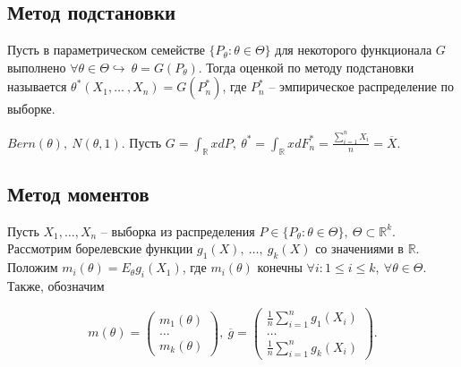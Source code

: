 \subsection*{Метод подстановки}

\begin{definition}
Пусть в параметрическом семействе $\displaystyle \{P_{\theta } :\theta \in \Theta \}$ для некоторого функционала $\displaystyle G$ выполнено $\displaystyle \forall \theta \in \Theta \hookrightarrow \ \theta =G( P_{\theta })$. Тогда оценкой по методу подстановки называется $\displaystyle \theta ^{*}( X_{1},\dotsc\ ,X_{n}) =G\left( P_{n}^{*}\right)$, где $\displaystyle P_{n}^{*}$ -- эмпирическое распределение по выборке.
\end{definition}
\begin{example}
$\displaystyle Bern( \theta ),\ N( \theta ,1)$. Пусть $\displaystyle G=\int _{\mathbb{R}} xdP,\ \theta ^{*} =\int _{\mathbb{R}} xdF_{n}^{*} =\frac{\sum _{i=1}^{n} X_{i}}{n} =\overline{X}$.
\end{example}

\subsection*{Метод моментов}

Пусть $\displaystyle X_{1} ,\dotsc ,X_{n}$ -- выборка из распределения $\displaystyle P\in \{P_{\theta } :\theta \in \Theta \},\ \Theta \subset \mathbb{R}^{k}$. Рассмотрим борелевские функции $\displaystyle g_{1}( X) ,\ \dotsc ,\ g_{k}( X)$ со значениями в $\displaystyle \mathbb{R}$. Положим $\displaystyle m_{i}( \theta ) =E_{\theta } g_{i}( X_{1})$, где $\displaystyle m_{i}( \theta )$ конечны $\displaystyle \forall i:1\leqslant i\leqslant k,\ \forall \theta \in \Theta $. Также, обозначим


\begin{equation*}
m( \theta ) =\begin{pmatrix}
m_{1}( \theta )\\
\dotsc \\
m_{k}( \theta )
\end{pmatrix} ,\ \overline{g} =\begin{pmatrix}
\frac{1}{n}\sum _{i=1}^{n} g_{1}( X_{i})\\
\dotsc \\
\frac{1}{n}\sum _{i=1}^{n} g_{k}( X_{i})
\end{pmatrix} .
\end{equation*}

